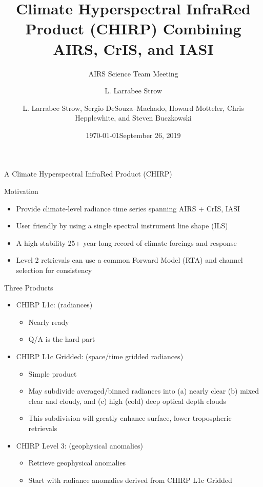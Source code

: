 \documentclass[10pt,t]{beamer}
\author{L. Larrabee Strow}
\date{\today}
\title{\large Climate Hyperspectral InfraRed Product (CHIRP) Combining AIRS, CrIS, and IASI}
\subtitle{\footnotesize{AIRS Science Team Meeting}}
\date{\vspace{0.1in}\footnotesize{September 26, 2019 \vfill}}
\author{L. Larrabee Strow\inst{1,2}, Sergio DeSouza--Machado\inst{1,2}, Howard Motteler\inst{2}, Chris Hepplewhite\inst{2}, and Steven Buczkowski\inst{2}}
\institute[UMBC]{\inst{1} UMBC Physics Dept. \and \inst{2}UMBC JCET}
\begin{document}
\maketitle
{}

\begin{frame}[label={sec:org1e98192},shrink=20]{A Climate Hyperspectral InfraRed Product (CHIRP)}
\vspace{-0.1in}
\begin{block}{Motivation}
\begin{itemize}
\item Provide climate-level radiance time series spanning AIRS + CrIS, IASI
\item User friendly by using a single spectral instrument line shape (ILS)
\item A high-stability 25+ year long record of climate forcings and response
\item Level 2 retrievals can use a common Forward Model (RTA) and channel selection for consistency
\end{itemize}
\end{block}

\begin{block}{Three Products}
\begin{itemize}
\item CHIRP L1c: (radiances)
\begin{itemize}
\item Nearly ready
\item Q/A is the hard part
\end{itemize}
\item CHIRP L1c Gridded: (space/time gridded radiances)
\begin{itemize}
\item Simple product
\item May subdivide averaged/binned radiances into (a) nearly clear (b) mixed clear and cloudy, and (c) high (cold) deep optical depth clouds
\item This subdivision will greatly enhance surface, lower tropospheric retrievals
\end{itemize}
\item CHIRP Level 3: (geophysical anomalies)
\begin{itemize}
\item Retrieve geophysical anomalies
\item Start with radiance anomalies derived from CHIRP L1c Gridded
\end{itemize}
\end{itemize}
\end{block}
\end{frame}
\end{document}

